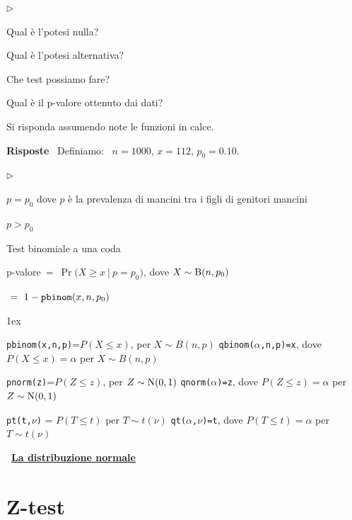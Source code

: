 \documentclass[11pt,openany]{book}
\newcommand{\mylabel}[1]{{\footnotesize\textsf{#1}}\hfill}
\renewenvironment{itemize}
  {\begin{list}{$\triangleright$}{%
   \setlength{\parskip}{0mm}
   \setlength{\topsep}{.2\baselineskip}
   \setlength{\rightmargin}{0mm}
   \setlength{\listparindent}{0mm}
   \setlength{\itemindent}{0mm}
   \setlength{\labelwidth}{3ex}
   \setlength{\itemsep}{.4\baselineskip}
   \setlength{\parsep}{0mm}
   \setlength{\partopsep}{0mm}
   \setlength{\labelsep}{1ex}
   \setlength{\leftmargin}{\labelwidth+\labelsep}
   \let\makelabel\mylabel}}{%
   \end{list}\vspace*{-1.3mm}}
\begin{document}
\begin{itemize}
\item[1.] Qual è l'potesi nulla?

\item[2.] Qual è l'potesi alternativa?

\item[3.] Che test possiamo fare?

\item[4.] Qual è il p-valore ottenuto dai dati?
\end{itemize}
Si risponda assumendo note le funzioni in calce.

\textbf{Risposte} \ Definiamo: \ $n=1000$,\quad
$x=112$,\quad
$p_0=0.10$.

\begin{itemize}
\item[1.] $p=p_0$ dove $p$ è la prevalenza di mancini tra i figli di genitori mancini
\item[2.]  $p>p_0$ 
\item[3.] Test binomiale a una coda
\item[4.] 


p-valore$\ =\ \Pr\big(X\ge x\ \mathbin\big|\ p=p_0\big)$, dove $X\sim{\rm B}(n,p_0)$ \medskip

\phantom{p-valore}$\ =\ 1 -{\tt  pbinom}(x,n,p_0)$
\end{itemize}


\vfill
\parskip1ex
{\hrulefill\scriptsize

{\tt pbinom(x,n,p)}=$P(X\le x)$, per $X\sim B(n,p)$
\hfill 
{\tt qbinom($\alpha$,n,p)=x},  dove $P(X\le x)=\alpha$ per $X\sim B(n,p)$

{\tt pnorm(z)}=$P(Z\le z)$, per $Z\sim {\rm N}(0,1)$
\hfill 
{\tt qnorm($\alpha$)=z},  dove $P(Z\le z)=\alpha$ per $Z\sim {\rm N}(0,1)$

{\tt pt(t,$\nu$)} = $P(T\le t)$ per $T\sim t(\nu)$
\hfill
{\tt qt($\alpha$,$\nu$)=t}, dove $P(T\le t)=\alpha$ per $T\sim t(\nu)$

}


\clearpage\
\hfill\textbf{{\color{brown}\hyperref[distribuzione normale]{La distribuzione normale \faShare}}}
\section{Z-test}
\label{Z-test}
\end{document}
